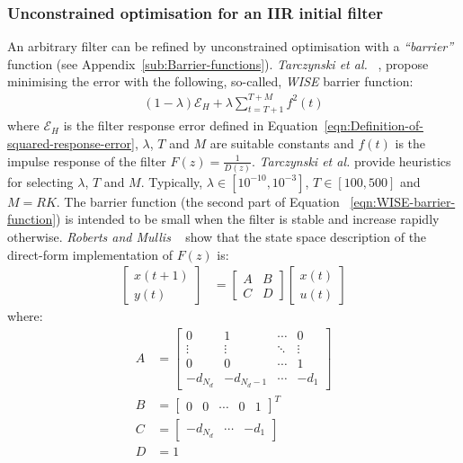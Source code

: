 \documentclass[a4paper,twoside,10pt,english]{report}
\begin{document}
\subsubsection{\label{Unconstrained-minimisation-with-barrier}Unconstrained optimisation for an IIR initial filter}
An arbitrary filter can be refined by unconstrained optimisation with a 
\emph{``barrier''} function (see Appendix~\ref{sub:Barrier-functions}). 
\emph{Tarczynski et al.} 
~\cite{TarczynskiCainHermanowiczRojewski_WISEMethodDesignIIRFilters}, propose
minimising the error with the following, so-called, \emph{WISE} barrier function:
\begin{align}
\label{eqn:WISE-barrier-function}
\left(1-\lambda\right)\mathcal{E}_{H}+\lambda\sum^{T+M}_{t=T+1}f^{2}\left(t\right)
\end{align}
where $\mathcal{E}_{H}$ is the filter response error defined in 
Equation~\ref{eqn:Definition-of-squared-response-error}, $\lambda$, $T$ and $M$ are 
suitable constants and $f\left(t\right)$ is the impulse response of the 
filter $F\left(z\right)=\frac{1}{D\left(z\right)}$. \emph{Tarczynski et al.} 
provide heuristics for selecting $\lambda$, $T$ and $M$. Typically, 
$\lambda \in \left[10^{-10},10^{-3}\right]$, $T\in \left[ 100, 500 \right]$ and 
$M=RK$. The barrier function (the second part of Equation 
~\ref{eqn:WISE-barrier-function}) is intended to be small when the filter is 
stable and increase rapidly otherwise. \emph{Roberts and Mullis} 
~\cite[Section 8.3]{RobertsMullis_DigitalSignalProcessing} show that the state
space description of the direct-form implementation of 
$F\left(z\right)$ is:
\begin{align*}
\left[\begin{array}{c}
x\left(t+1\right)\\
y\left(t\right)
\end{array}\right] &= \left[\begin{array}{cc}
A & B\\
C & D
\end{array}\right]\left[\begin{array}{c}
x\left(t\right)\\
u\left(t\right)
\end{array}\right]
\end{align*}
where:
\begin{align*}
A &= \left[\begin{array}{cccc}
0 & 1 & \cdots & 0\\
\vdots & \vdots & \ddots & \vdots\\
0 & 0 & \cdots & 1\\
-d_{N_{d}} & -d_{N_{d}-1} & \cdots & -d_{1}
\end{array}\right]\\
B &= \left[\begin{array}{ccccc}0 & 0 & \cdots & 0 & 1\end{array}\right]^{T}\\
C &= \left[\begin{array}{ccc}-d_{N_{d}} & \cdots & -d_{1}\end{array}\right]\\
D &= 1
\end{align*}
\end{document}
